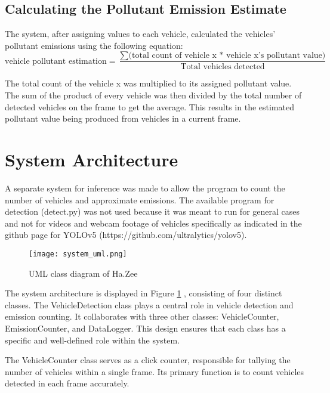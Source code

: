 \subsection{Calculating the Pollutant Emission Estimate}

The system, after assigning values to each vehicle, calculated the vehicles’ pollutant emissions using the following equation:
\begin{equation}
\text{vehicle pollutant estimation} = \frac{\sum\text{(total count of vehicle x * vehicle x's pollutant value)}}{\text{Total vehicles detected}}
\end{equation}

The total count of the vehicle x was multiplied to its assigned pollutant value. The sum of the product of every vehicle was then divided by the total number of detected vehicles on the frame to get the average. This results in the estimated pollutant value being produced from vehicles in a current frame.


\section{System Architecture}

A separate system for inference was made to allow the program to count the number of vehicles and approximate emissions. The available program for detection (detect.py) was not used because it was meant to run for general cases and not for videos and webcam footage of vehicles specifically as indicated in the github page for YOLOv5 (https://github.com/ultralytics/yolov5). 

\begin{figure}[!htbp]
	\texttt{[image: system\_uml.png]}
	\caption{UML class diagram of Ha.Zee}
	\label{fig:system_uml}
\end{figure}
\FloatBarrier

The system architecture is displayed in Figure \ref{fig:system_uml} , consisting of four distinct classes. The VehicleDetection class plays a central role in vehicle detection and emission counting. It collaborates with three other classes: VehicleCounter, EmissionCounter, and DataLogger. This design ensures that each class has a specific and well-defined role within the system.

The VehicleCounter class serves as a click counter, responsible for tallying the number of vehicles within a single frame. Its primary function is to count vehicles detected in each frame accurately.


